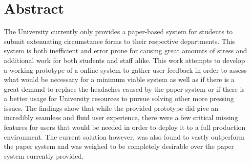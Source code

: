 \chapter*{\Large \center Abstract}

The University currently only provides a paper-based system for students to submit extenuating circumstance forms to their respective departments. This system is both inefficient and error prone for causing great amounts of stress and additional work for both students and staff alike. This work attempts to develop a working prototype of a online system to gather user feedback in order to assess what would be necessary for a minimum viable system as well as if there is a great demand to replace the headaches caused by the paper system or if there is a better usage for University resources to pursue solving other more pressing issues. The findings show that while the provided prototype did give an incredibly seamless and fluid user experience, there were a few critical missing features for users that would be needed in order to deploy it to a full production environment. The current solution however, was also found to vastly outperform the paper system and was weighed to be completely desirable over the paper system currently provided.